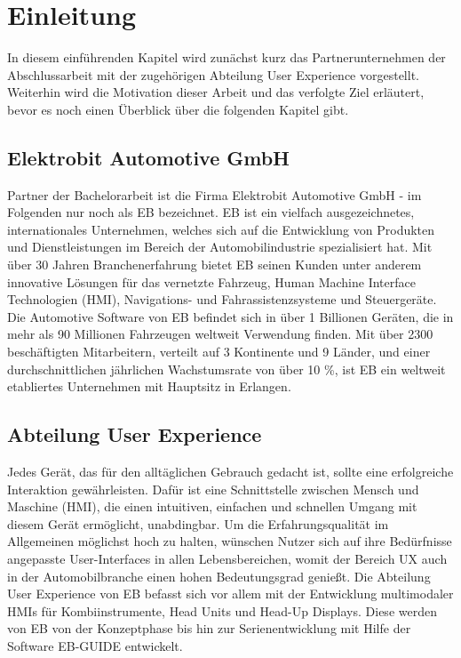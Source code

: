 \chapter{Einleitung}\label{ch:intro}

In diesem einführenden Kapitel wird zunächst kurz das Partnerunternehmen der Abschlussarbeit mit der zugehörigen Abteilung User Experience vorgestellt.
Weiterhin wird die Motivation dieser Arbeit und das verfolgte Ziel erläutert, bevor es noch einen Überblick über die folgenden Kapitel gibt.

\section{Elektrobit Automotive GmbH}
Partner der Bachelorarbeit ist die Firma Elektrobit Automotive GmbH - im Folgenden nur noch als EB bezeichnet.
EB ist ein vielfach ausgezeichnetes, internationales Unternehmen, welches sich auf die Entwicklung von Produkten und Dienstleistungen im Bereich der Automobilindustrie spezialisiert hat.
Mit über 30 Jahren Branchenerfahrung bietet EB seinen Kunden unter anderem innovative Lösungen für das vernetzte Fahrzeug, Human Machine Interface Technologien (HMI), Navigations- und Fahrassistenzsysteme und Steuergeräte. 
Die Automotive Software von EB befindet sich in über 1 Billionen Geräten, die in mehr als 90 Millionen Fahrzeugen weltweit Verwendung finden.
Mit über 2300 beschäftigten Mitarbeitern, verteilt auf 3 Kontinente und 9 Länder, und einer durchschnittlichen jährlichen Wachstumsrate von über 10 \%, ist EB ein weltweit etabliertes Unternehmen mit Hauptsitz in Erlangen\cite{about_eb}.

\section{Abteilung User Experience}
\label{ch:abteilung}
Jedes Gerät, das für den alltäglichen Gebrauch gedacht ist, sollte eine erfolgreiche Interaktion gewährleisten.
Dafür ist eine Schnittstelle zwischen Mensch und Maschine (HMI), die einen intuitiven, einfachen und schnellen Umgang mit diesem Gerät ermöglicht, unabdingbar.
Um die Erfahrungsqualität im Allgemeinen möglichst hoch zu halten, wünschen Nutzer sich auf ihre Bedürfnisse angepasste User-Interfaces in allen Lebensbereichen, womit der Bereich UX auch in der Automobilbranche einen hohen Bedeutungsgrad genießt.
Die Abteilung User Experience von EB befasst sich vor allem mit der Entwicklung multimodaler HMIs für Kombiinstrumente, Head Units und Head-Up Displays.
Diese werden von EB von der Konzeptphase bis hin zur Serienentwicklung mit Hilfe der Software EB-GUIDE entwickelt.

